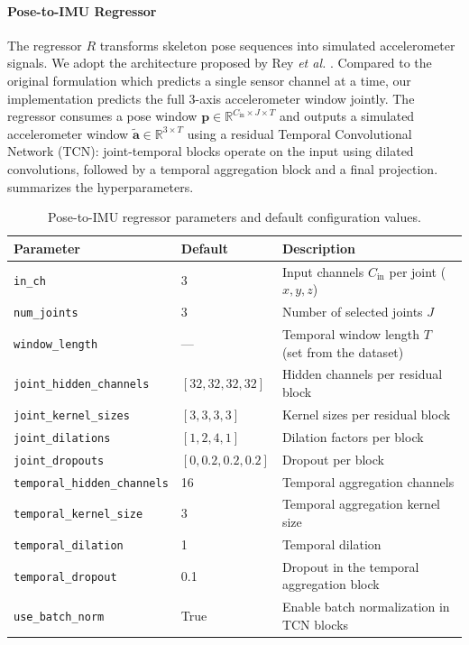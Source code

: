\paragraph{Pose-to-IMU Regressor}
The regressor $R$ transforms skeleton pose sequences into simulated accelerometer signals. We adopt the architecture proposed by Rey \textit{et al.} \cite{fortes2021translating}. Compared to the original formulation which predicts a single sensor channel at a time, our implementation predicts the full 3-axis accelerometer window jointly. The regressor consumes a pose window $\mathbf{p} \in \mathbb{R}^{C_{\text{in}} \times J \times T}$ and outputs a simulated accelerometer window $\tilde{\mathbf{a}} \in \mathbb{R}^{3 \times T}$ using a residual Temporal Convolutional Network (TCN): joint-temporal blocks operate on the input using dilated convolutions, followed by a temporal aggregation block and a final projection.  summarizes the hyperparameters.

\begin{table}[!t]
\centering
\caption{Pose-to-IMU regressor parameters and default configuration values.}
\label{tab:regressor-params}
\begin{tabular}{llp{6.5cm}}
\hline
\textbf{Parameter} & \textbf{Default} & \textbf{Description} \\
\hline
\texttt{in\_ch} & 3 & Input channels $C_{\text{in}}$ per joint ($x,y,z$) \\
\texttt{num\_joints} & 3 & Number of selected joints $J$ \\
\texttt{window\_length} & --- & Temporal window length $T$ (set from the dataset) \\
\texttt{joint\_hidden\_channels} & $[32, 32, 32, 32]$ & Hidden channels per residual block \\
\texttt{joint\_kernel\_sizes} & $[3, 3, 3, 3]$ & Kernel sizes per residual block \\
\texttt{joint\_dilations} & $[1, 2, 4, 1]$ & Dilation factors per block \\
\texttt{joint\_dropouts} & $[0, 0.2, 0.2, 0.2]$ & Dropout per block \\
\texttt{temporal\_hidden\_channels} & 16 & Temporal aggregation channels \\
\texttt{temporal\_kernel\_size} & 3 & Temporal aggregation kernel size \\
\texttt{temporal\_dilation} & 1 & Temporal dilation \\
\texttt{temporal\_dropout} & 0.1 & Dropout in the temporal aggregation block \\
\texttt{use\_batch\_norm} & True & Enable batch normalization in TCN blocks \\
\hline
\end{tabular}
\end{table}

